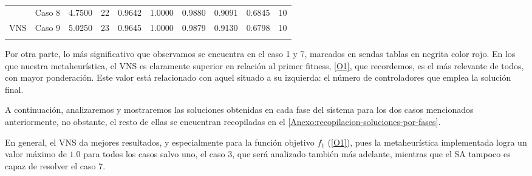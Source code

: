 \begin{table}
{\begin{tabular}{cccccccccc}
			\multicolumn{1}{c|}{}                      & {\color[HTML]{003532} Caso 8} & {\color[HTML]{003532} 4.7500}                                        & {\color[HTML]{003532} 22}                                          & {\color[HTML]{003532} 0.9642}                           & {\color[HTML]{003532} 1.0000} & {\color[HTML]{003532} 0.9880} & {\color[HTML]{003532} 0.9091} & {\color[HTML]{003532} 0.6845} & {\color[HTML]{003532} 10}                                            \\
			\multicolumn{1}{c|}{\multirow{-8}{*}{VNS}} & Caso 9                        & 5.0250                                                               & 23                                                                 & 0.9645                                                  & 1.0000                        & 0.9879                        & 0.9130                        & 0.6798                        & 10                                                                   \\
			\multicolumn{10}{c}{}                                                                                                                                                                                                                                                                                                                                                                                                                                                                   \\ \hline
		\end{tabular}%
	}
\end{table}

Por otra parte, lo más significativo que observamos se encuentra en el caso 1 y 7, marcados en sendas tablas en negrita color rojo. En los que nuestra metaheurística, el VNS es claramente superior en relación al primer fitness, \ref{O1}, que recordemos, es el más relevante de todos, con mayor ponderación. Este valor está relacionado con aquel situado a su izquierda: el número de controladores que emplea la solución final. 

A continuación, analizaremos y mostraremos las soluciones obtenidas en cada fase del sistema para los dos casos mencionados anteriormente, no obstante, el resto de ellas se encuentran recopiladas en el \autoref{Anexo:recopilacion-soluciones-por-fases}.

En general, el VNS da mejores resultados, y especialmente para la función objetivo $f_1$ (\ref{O1}), pues la metaheurística implementada logra un valor máximo de $1.0$ para todos los casos salvo uno, el caso 3, que será analizado también más adelante, mientras que el SA tampoco es capaz de resolver el caso 7. %

